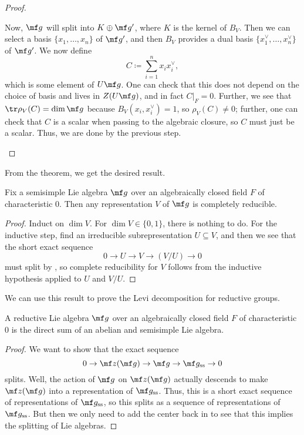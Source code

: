 \documentclass[../notes.tex]{subfiles}
\begin{document}
\begin{proof}
\begin{enumerate}
		Now, $\mf g$ will split into $K\oplus\mf g'$, where $K$ is the kernel of $B_V$. Then we can select a basis $\{x_1,\ldots,x_n\}$ of $\mf g'$, and then $B_V$ provides a dual basis $\{x_1^\lor,\ldots,x_n^\lor\}$ of $\mf g'$. We now define
		\[C\coloneqq\sum_{i=1}^nx_ix_i^\lor,\]
		which is some element of $U\mf g$. One can check that this does not depend on the choice of basis and lives in $Z(U\mf g)$, and in fact $C|_F=0$. Further, we see that $\tr\rho_V(C)=\dim\mf g$ because $B_V(x_i,x_i^\lor)=1$, so $\rho_V(C)\ne0$; further, one can check that $C$ is a scalar when passing to the algebraic closure, so $C$ must just be a scalar. Thus, we are done by the previous step.
		\qedhere
	\end{enumerate}
\end{proof}
From the theorem, we get the desired result.
\begin{corollary}
	Fix a semisimple Lie algebra $\mf g$ over an algebraically closed field $F$ of characteristic $0$. Then any representation $V$ of $\mf g$ is completely reducible.
\end{corollary}
\begin{proof}
	Induct on $\dim V$. For $\dim V\in\{0,1\}$, there is nothing to do. For the inductive step, find an irreducible subrepresentation $U\subseteq V$, and then we see that the short exact sequence
	\[0\to U\to V\to(V/U)\to0\]
	must split by , so complete reducibility for $V$ follows from the inductive hypothesis applied to $U$ and $V/U$.
\end{proof}
We can use this result to prove the Levi decomposition for reductive groups.
\begin{corollary}
	A reductive Lie algebra $\mf g$ over an algebraically closed field $F$ of characteristic $0$ is the direct sum of an abelian and semisimple Lie algebra.
\end{corollary}
\begin{proof}
	We want to show that the exact sequence
	\[0\to\mf z(\mf g)\to\mf g\to\mf g_{\mathrm{ss}}\to0\]
	splits. Well, the action of $\mf g$ on $\mf z(\mf g)$ actually descends to make $\mf z(\mf g)$ into a representation of $\mf g_{\mathrm{ss}}$. Thus, this is a short exact sequence of representations of $\mf g_{\mathrm{ss}}$, so this splits as a sequence of representations of $\mf g_{\mathrm{ss}}$. But then we only need to add the center back in to see that this implies the splitting of Lie algebras.
\end{proof}
\end{document}
